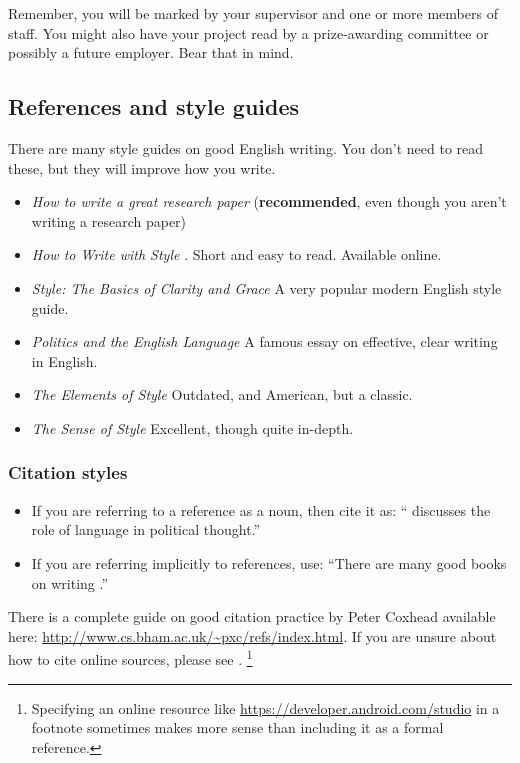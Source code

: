 Remember, you will be marked by your supervisor and one or more members
of staff. You might also have your project read by a prize-awarding
committee or possibly a future employer. Bear that in mind.

\subsection{References and style guides}
There are many style guides on good English writing. You don't need to
read these, but they will improve how you write.

\begin{itemize}
    \item
    \emph{How to write a great research paper} \cite{Pey17} (\textbf{recommended}, even though you aren't writing a research paper)
    \item
    \emph{How to Write with Style} \cite{Von80}. Short and easy to read. Available online.
    \item
    \emph{Style: The Basics of Clarity and Grace} \cite{Wil09} A very popular modern English style guide.
    \item
    \emph{Politics and the English Language} \cite{Orw68}  A famous essay on effective, clear writing in English.
    \item
    \emph{The Elements of Style} \cite{StrWhi07} Outdated, and American, but a classic.
    \item
    \emph{The Sense of Style} \cite{Pin15} Excellent, though quite in-depth.
\end{itemize}

\subsubsection{Citation styles}

\begin{itemize}
\item If you are referring to a reference as a noun, then cite it as: ``\citet{Orw68} discusses the role of language in political thought.''
\item If you are referring implicitly to references, use: ``There are many good books on writing \citep{Orw68, Wil09, Pin15}.''
\end{itemize}

There is a complete guide on good citation practice by Peter Coxhead available here: \url{http://www.cs.bham.ac.uk/~pxc/refs/index.html}. 
If you are unsure about how to cite online sources, please see \citet{UNSWWebsite}. 
\footnote{Specifying an online resource like \url{https://developer.android.com/studio}
in a footnote sometimes makes more sense than including it as a formal reference.}

